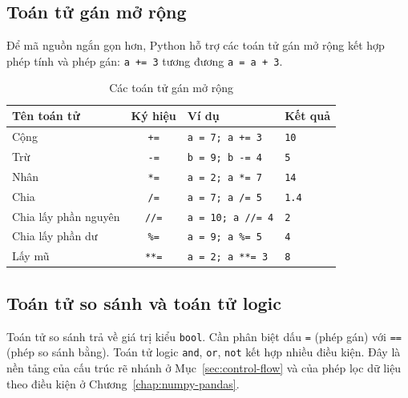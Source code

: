 \subsection{Toán tử gán mở rộng}
Để mã nguồn ngắn gọn hơn, Python hỗ trợ các toán tử gán mở rộng kết hợp phép tính và phép gán: \texttt{a += 3} tương đương \texttt{a = a + 3}.
\begin{table}[H]
\centering
\begin{tabular}{|l|c|l|l|}
\hline
\textbf{Tên toán tử} & \textbf{Ký hiệu} & \textbf{Ví dụ} & \textbf{Kết quả} \\
\hline
Cộng & \texttt{+=} & \texttt{a = 7; a += 3} & \texttt{10} \\
\hline
Trừ & \texttt{-=} & \texttt{b = 9; b -= 4} & \texttt{5} \\
\hline
Nhân & \texttt{*=} & \texttt{a = 2; a *= 7} & \texttt{14} \\
\hline
Chia & \texttt{/=} & \texttt{a = 7; a /= 5} & \texttt{1.4} \\
\hline
Chia lấy phần nguyên & \texttt{//=} & \texttt{a = 10; a //= 4} & \texttt{2} \\
\hline
Chia lấy phần dư & \texttt{\%=} & \texttt{a = 9; a \%= 5} & \texttt{4} \\
\hline
Lấy mũ & \texttt{**=} & \texttt{a = 2; a **= 3} & \texttt{8} \\
\hline
\end{tabular}
\caption{Các toán tử gán mở rộng}
\end{table}

\subsection{Toán tử so sánh và toán tử logic}

Toán tử so sánh trả về giá trị kiểu \texttt{bool}. Cần phân biệt dấu \texttt{=} (phép gán) với \texttt{==} (phép so sánh bằng). Toán tử logic \texttt{and}, \texttt{or}, \texttt{not} kết hợp nhiều điều kiện. Đây là nền tảng của cấu trúc rẽ nhánh ở Mục~\ref{sec:control-flow} và của phép lọc dữ liệu theo điều kiện ở Chương~\ref{chap:numpy-pandas}.


